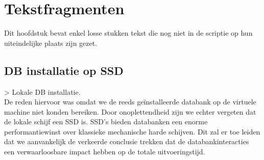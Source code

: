 \chapter{Tekstfragmenten}


Dit hoofdstuk bevat enkel losse stukken tekst die nog niet in de scriptie op hun uiteindelijke plaats zijn gezet.

\section{DB installatie op SSD}

> Lokale DB installatie. \\
De reden hiervoor was omdat we de reeds geïnstalleerde databank op de virtuele machine niet konden bereiken.
Door onoplettendheid zijn we echter vergeten dat de lokale schijf een SSD is.
SSD's bieden databanken een enorme performantiewinst over klassieke mechanische harde schijven.
Dit zal er toe leiden dat we aanvankelijk de verkeerde conclusie trekken dat de databankinteracties
een verwaarloosbare impact hebben op de totale uitvoeringstijd.